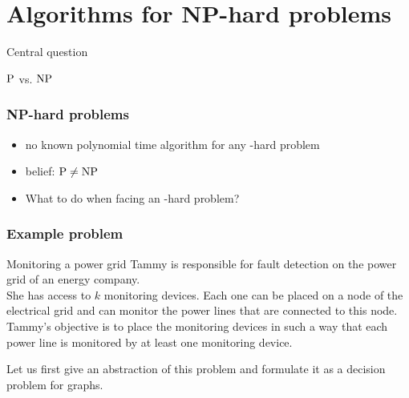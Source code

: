 
\newcommand{\mycomp}[1]{\pgfmathparse{#1}\pgfmathprintnumber[precision=0]{\pgfmathresult}}




\section{Algorithms for NP-hard problems}

\begin{frame}
	Central question
	\begin{center}
		{\huge $\P$ vs. $\NP$}
	\end{center}
\end{frame}

\begin{frame}
	\frametitle{NP-hard problems}

	\begin{itemize}
		\item no known polynomial time algorithm for any \NP-hard problem
		\item belief: $\P \neq \NP$
		\item What to do when facing an \NP-hard problem?
	\end{itemize}
\end{frame}


\begin{frame}
	\frametitle{Example problem}

	\begin{block}{Monitoring a power grid}
		Tammy is responsible for fault detection on the power grid of an energy company.\\\smallskip
		She has access to $k$ monitoring devices. Each one can be placed on a node of the electrical grid and can monitor the power lines that are connected to this node.\\\smallskip
		Tammy's objective is to place the monitoring devices in such a way that each power line is monitored by at least one monitoring device.
	\end{block}
	Let us first give an abstraction of this problem and formulate it as a decision problem for graphs.
\end{frame}


